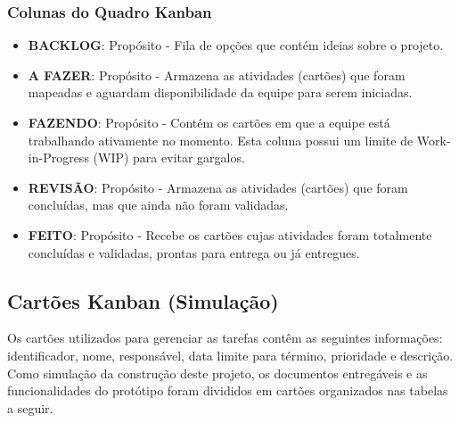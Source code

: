 \subsubsection{Colunas do Quadro Kanban}
\begin{itemize}
    \item \textbf{BACKLOG}: Propósito - Fila de opções que contém ideias 
    sobre o projeto.
    \item \textbf{A FAZER}: Propósito - Armazena as atividades (cartões) 
    que foram mapeadas e aguardam disponibilidade da equipe para serem 
    iniciadas.
    \item \textbf{FAZENDO}: Propósito - Contém os cartões em que a equipe 
    está trabalhando ativamente no momento. Esta coluna possui um limite de 
    Work-in-Progress (WIP) para evitar gargalos.
    \item \textbf{REVISÃO}: Propósito - Armazena as atividades (cartões) 
    que foram concluídas, mas que ainda não foram validadas.
    \item \textbf{FEITO}: Propósito - Recebe os cartões cujas atividades foram 
    totalmente concluídas e validadas, prontas para entrega ou já entregues.
\end{itemize}



\subsection{Cartões Kanban (Simulação)}
Os cartões utilizados para gerenciar as tarefas contêm as seguintes 
informações: identificador, nome, responsável, data limite para término, 
prioridade e descrição. Como simulação da construção deste projeto, os 
documentos entregáveis e as funcionalidades do protótipo foram divididos em 
cartões organizados nas tabelas a seguir.


